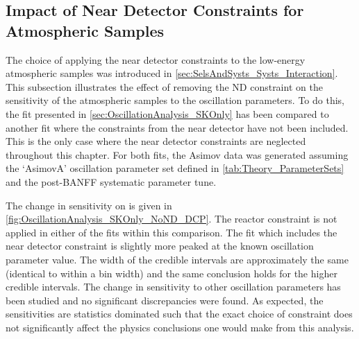 \clearpage
\subsection{Impact of Near Detector Constraints for Atmospheric Samples}
\label{sec:OscillationAnalysis_SKOnly_NoND}

The choice of applying the near detector constraints to the low-energy atmospheric samples was introduced in \autoref{sec:SelsAndSysts_Systs_Interaction}. This subsection illustrates the effect of removing the ND constraint on the sensitivity of the atmospheric samples to the oscillation parameters. To do this, the fit presented in \autoref{sec:OscillationAnalysis_SKOnly} has been compared to another fit where the constraints from the near detector have not been included.
This is the only case where the near detector constraints are neglected throughout this chapter. For both fits, the Asimov data was generated assuming the `AsimovA' oscillation parameter set defined in \autoref{tab:Theory_ParameterSets} and the post-BANFF systematic parameter tune.

The change in sensitivity on  is given in \autoref{fig:OscillationAnalysis_SKOnly_NoND_DCP}. The reactor constraint is not applied in either of the fits within this comparison. The fit which includes the near detector constraint is slightly more peaked at the known oscillation parameter value. The width of the \quickmath{1\sigma} credible intervals are approximately the same (identical to within a bin width) and the same conclusion holds for the higher credible intervals. The change in sensitivity to other oscillation parameters has been studied and no significant discrepancies were found. As expected, the sensitivities are statistics dominated such that the exact choice of constraint does not significantly affect the physics conclusions one would make from this analysis.

